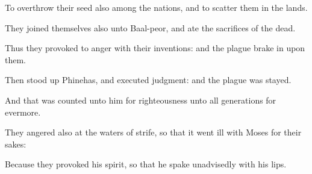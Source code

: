 {\par }{\Q {}To
overthrow their
seed also among the
nations, and to
scatter them in the
lands.


\par }{\Q {}They
joined themselves also unto
Baal-peor, and
ate the
sacrifices of the
dead.


\par }{\Q {}Thus they provoked
{} to
anger with their
inventions: and the
plague brake
in upon them.


\par }{\Q {}Then stood
up
Phinehas, and executed
judgment: and
{} the
plague was
stayed.


\par }{\Q {}And that was
counted unto him for
righteousness unto
all
generations
for
evermore.


\par }{\Q {}They
angered
{} also at the
waters of
strife, so that it went
ill with
Moses for their sakes:


\par }{\Q {}Because they
provoked his
spirit, so that he spake
unadvisedly with his
lips.


\par }{\BB \par }
